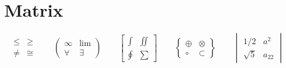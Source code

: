 \documentclass[12pt,twoside,a4paper]{article}
\begin{document}
\section{Matrix}
\[
\begin{matrix}   \leq    &  \geq     \\  \neq      &  \cong       \end{matrix}   \hspace{2em}
\begin{pmatrix}  \infty  &  \lim     \\  \forall   &  \exists     \end{pmatrix}  \hspace{2em}
\begin{bmatrix}  \int    &  \iint    \\  \oint     &  \sum        \end{bmatrix}  \hspace{2em}
\begin{Bmatrix}  \oplus  &  \otimes  \\  \circ     &  \subset     \end{Bmatrix}  \hspace{2em}
\begin{vmatrix}  1/2     &  a^2      \\  \sqrt{5}  &  a_{22}      \end{vmatrix}  \hspace{2em}
\]
\end{document}

